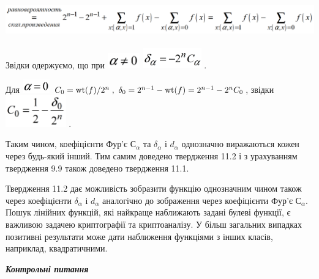 \documentclass[a4paper]{article}
\newcounter{}
\newcommand\normalsubformula[1]{\text{\mathversion{normal}$#1$}}
\begin{document}
 \includegraphics[width=6.3in,height=0.5965in]{crypt-img/crypt-img287.png} 

\textcolor[rgb]{0.0,0.5019608,0.0}{Звідки}
\textcolor[rgb]{0.0,0.5019608,0.0}{одержуємо}, що при 
\includegraphics[width=0.5484in,height=0.261in]{crypt-img/crypt-img288.png} 
\includegraphics[width=0.9957in,height=0.339in]{crypt-img/crypt-img289.png} . 

Для 
\includegraphics[width=0.4646in,height=0.2256in]{crypt-img/crypt-img290.png}  
${C_{{0}}=\normalsubformula{\text{wt}}(f)/2^{{n}}\;,\ \delta
_{{0}}=2^{{n-1}}-\normalsubformula{\text{wt}}(f)=2^{{n-1}}-2^{{n}}C_{{0}}}$,
звідки 
\includegraphics[width=1.028in,height=0.5374in]{crypt-img/crypt-img291.png} .

Таким чином, коефіцієнти  Фур’є   ${\text{С}_{{\alpha }}}$ та  ${\delta
_{{\alpha }}}$  і   ${d_{{\alpha }}}$ однозначно виражаються кожен через
будь-який інший. Тим самим доведено твердження 11.2 і з урахуванням твердження
9.9\textit{  }також доведено твердження 11.1. 

Твердження 11.2 дає можливість зобразити функцію однозначним чином також через
коефіцієнти   ${\delta _{{\alpha }}}$  і   ${d_{{\alpha }}}$ аналогічно до
зображення через коефіцієнти  Фур’є   ${\text{С}_{{\alpha }}}$. Пошук лінійних
функцій, які найкраще наближають задані булеві функції, є важливою задачею
криптографії та криптоаналізу. У більш загальних випадках позитивні результати
може дати наближення функціями з інших класів, наприклад, квадратичними.


\bigskip


\bigskip

{\centering\bfseries\itshape
Контрольні питання
\par}
\end{document}
